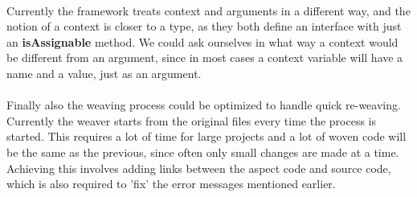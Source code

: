 \documentclass[a4paper]{report}
\begin{document}
\\
Currently the framework treats context and arguments in a different way, and the notion of a context is closer to a type, as they both define an interface with just an \textbf{isAssignable} method. We could ask ourselves in what way a context would be different from an argument, since in most cases a context variable will have a name and a value, just as an argument.\\
\\
Finally also the weaving process could be optimized to handle quick re-weaving. Currently the weaver starts from the original files every time the process is started. This requires a lot of time for large projects and a lot of woven code will be the same as the previous, since often only small changes are made at a time. Achieving this involves adding links between the aspect code and source code, which is also required to 'fix' the error messages mentioned earlier.
\end{document}
